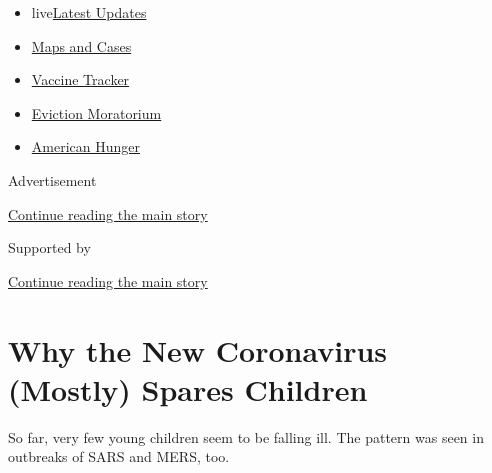 \begin{itemize}
\tightlist
\item
  live\href{https://www.nytimes3xbfgragh.onion/2020/09/08/world/covid-19-coronavirus.html?name=styln-coronavirus-national\&region=TOP_BANNER\&block=storyline_menu_recirc\&action=click\&pgtype=Article\&impression_id=d9441361-f1ea-11ea-b089-5de7c98ed547\&variant=undefined}{Latest
  Updates}
\item
  \href{https://www.nytimes3xbfgragh.onion/interactive/2020/us/coronavirus-us-cases.html?name=styln-coronavirus-national\&region=TOP_BANNER\&block=storyline_menu_recirc\&action=click\&pgtype=Article\&impression_id=d9441362-f1ea-11ea-b089-5de7c98ed547\&variant=undefined}{Maps
  and Cases}
\item
  \href{https://www.nytimes3xbfgragh.onion/interactive/2020/science/coronavirus-vaccine-tracker.html?name=styln-coronavirus-national\&region=TOP_BANNER\&block=storyline_menu_recirc\&action=click\&pgtype=Article\&impression_id=d9443a70-f1ea-11ea-b089-5de7c98ed547\&variant=undefined}{Vaccine
  Tracker}
\item
  \href{https://www.nytimes3xbfgragh.onion/2020/09/02/your-money/eviction-moratorium-covid.html?name=styln-coronavirus-national\&region=TOP_BANNER\&block=storyline_menu_recirc\&action=click\&pgtype=Article\&impression_id=d9443a71-f1ea-11ea-b089-5de7c98ed547\&variant=undefined}{Eviction
  Moratorium}
\item
  \href{https://www.nytimes3xbfgragh.onion/interactive/2020/09/02/magazine/food-insecurity-hunger-us.html?name=styln-coronavirus-national\&region=TOP_BANNER\&block=storyline_menu_recirc\&action=click\&pgtype=Article\&impression_id=d9443a72-f1ea-11ea-b089-5de7c98ed547\&variant=undefined}{American
  Hunger}
\end{itemize}

Advertisement

\protect\hyperlink{after-top}{Continue reading the main story}

Supported by

\protect\hyperlink{after-sponsor}{Continue reading the main story}

\hypertarget{why-the-new-coronavirus-mostly-spares-children}{%
\section{Why the New Coronavirus (Mostly) Spares
Children}\label{why-the-new-coronavirus-mostly-spares-children}}

So far, very few young children seem to be falling ill. The pattern was
seen in outbreaks of SARS and MERS, too.

